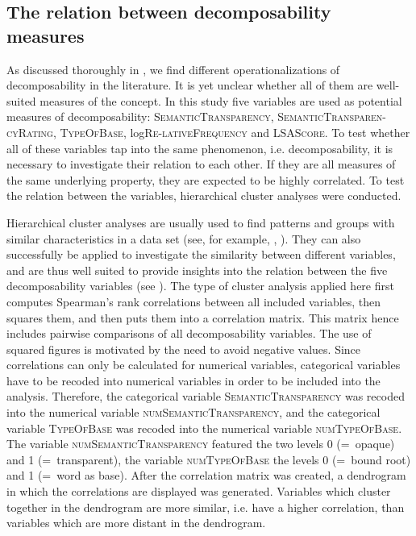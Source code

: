 \subsection{The relation between decomposability measures} \label{The Relation between Decomposability Measures} 

\vspace*{0.2cm}


As discussed thoroughly in , we find different operationalizations of decomposability in the literature. It is yet unclear whether all of them are well-suited measures of the concept. In this study five variables are used as potential measures of decomposability: \textsc{SemanticTransparency}, \textsc{SemanticTransparen-cyRating}, \textsc{TypeOfBase}, log\textsc{Re-lativeFrequency} and \textsc{LSAScore}.
To test whether all of these variables tap into the same phenomenon, i.e. decomposability, it is necessary to investigate their relation to each other. If they are all measures of the same underlying property, they are expected to be highly correlated. To test the relation between the variables, hierarchical cluster analyses were conducted. 

Hierarchical cluster analyses are usually used to find patterns and groups with similar characteristics in a data  set (see, for example, \citealt[chapter 5.1.5]{Baayen.2008}, \citealt[chapter 8.1]{Zumel.2014}). They can also successfully be applied to investigate the similarity between different variables, and are thus well suited to provide insights into the relation between the five decomposability variables (see \citealt[200 f.]{Baayen.2008}). 
The type of cluster analysis applied here first computes Spearman's rank correlations between all included variables, then squares them, and then puts them into a correlation matrix. This matrix hence includes pairwise comparisons of all decomposability variables. The use of squared figures is motivated by the need to avoid negative values.
Since correlations can only be calculated for numerical variables,  categorical variables have to be recoded into numerical variables in order to be included into the analysis. 
Therefore, the categorical variable \textsc{SemanticTransparency}  was recoded into the numerical variable \textsc{numSemanticTransparency}, and the categorical variable \textsc{TypeOfBase} was recoded into the numerical variable \textsc{numTypeOfBase}.  The variable \textsc{numSemanticTransparency} featured  the two levels 0 (=~opaque) and 1 (=~transparent), the variable \textsc{numTypeOfBase} the levels 0 (=~bound root) and 1 (=~word as base). After the correlation matrix was created,  a dendrogram in which the correlations are displayed was generated. Variables which cluster together in the dendrogram are more similar, i.e. have a higher correlation, than variables which are more distant in the dendrogram. 

